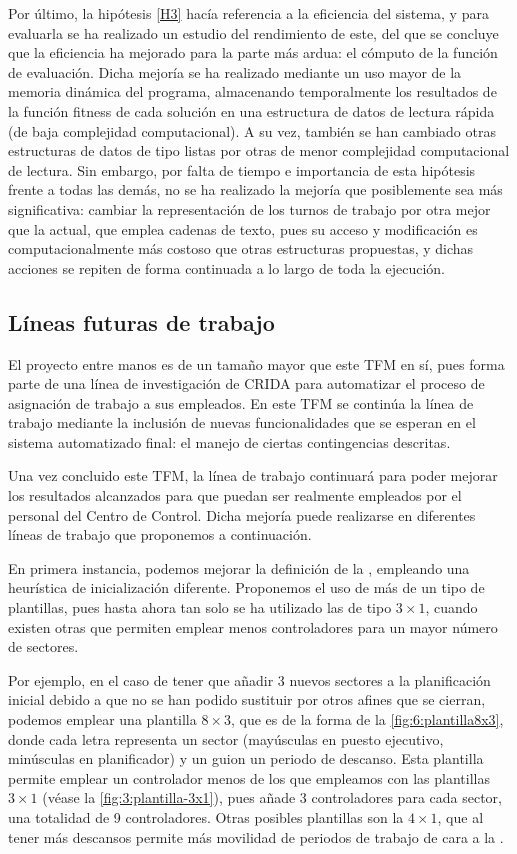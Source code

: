 Por último, la hipótesis \ref{H3} hacía referencia a la eficiencia del sistema, y para evaluarla se ha realizado un estudio del rendimiento de este, del que se concluye que la eficiencia ha mejorado para la parte más ardua: el cómputo de la función de evaluación. Dicha mejoría se ha realizado mediante un uso mayor de la memoria dinámica del programa, almacenando temporalmente los resultados de la función fitness de cada solución en una estructura de datos de lectura rápida (de baja complejidad computacional). A su vez, también se han cambiado otras estructuras de datos de tipo listas por otras de menor complejidad computacional de lectura. Sin embargo, por falta de tiempo e importancia de esta hipótesis frente a todas las demás, no se ha realizado la mejoría que posiblemente sea más significativa: cambiar la representación de los turnos de trabajo por otra mejor que la actual, que emplea cadenas de texto, pues su acceso y modificación es computacionalmente más costoso que otras estructuras propuestas, y dichas acciones se repiten de forma continuada a lo largo de toda la ejecución.

\subsection{Líneas futuras de trabajo}
\label{sec:6:trabajo-futuro}

El proyecto entre manos es de un tamaño mayor que este TFM en sí, pues forma parte de una línea de investigación de \gls{CRIDA} para automatizar el proceso de asignación de trabajo a sus empleados. En este TFM se continúa la línea de trabajo mediante la inclusión de nuevas funcionalidades que se esperan en el sistema automatizado final: el manejo de ciertas contingencias descritas.

Una vez concluido este TFM, la línea de trabajo continuará para poder mejorar los resultados alcanzados para que puedan ser realmente empleados por el personal del Centro de Control. Dicha mejoría puede realizarse en diferentes líneas de trabajo que proponemos a continuación.

En primera instancia, podemos mejorar la definición de la \faseuno{}, empleando una heurística de inicialización diferente. Proponemos el uso de más de un tipo de plantillas, pues hasta ahora tan solo se ha utilizado las de tipo $3\times1$, cuando existen otras que permiten emplear menos controladores para un mayor número de sectores. 

Por ejemplo, en el caso de tener que añadir 3 nuevos sectores a la planificación inicial debido a que no se han podido sustituir por otros afines que se cierran, podemos emplear una plantilla $8\times3$, que es de la forma de la \autoref{fig:6:plantilla8x3}, donde cada letra representa un sector (mayúsculas en puesto ejecutivo, minúsculas en planificador) y un guion un periodo de descanso. Esta plantilla permite emplear un controlador menos de los que empleamos con las plantillas $3\times1$ (véase la \autoref{fig:3:plantilla-3x1}), pues añade 3 controladores para cada sector, una totalidad de 9 controladores. Otras posibles plantillas son la $4\times1$, que al tener más descansos permite más movilidad de periodos de trabajo de cara a la \fasedos{}. 

